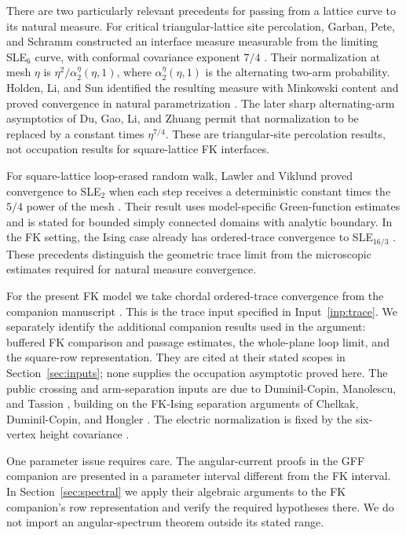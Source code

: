 There are two particularly relevant precedents for passing from a
lattice curve to its natural measure. For critical triangular-lattice
site percolation, Garban, Pete, and Schramm constructed an interface
measure measurable from the limiting SLE$_6$ curve, with conformal
covariance exponent $7/4$ \cite{GPS}. Their normalization at mesh
$\eta$ is $\eta^2/\alpha_2^\eta(\eta,1)$, where
$\alpha_2^\eta(\eta,1)$ is the alternating two-arm probability.
Holden, Li, and Sun identified the resulting measure with Minkowski
content and proved convergence in natural parametrization \cite{HLS}.
The later sharp alternating-arm asymptotics of Du, Gao, Li, and Zhuang
\cite{DGLZ} permit that normalization to be replaced by a constant
times $\eta^{7/4}$. These are triangular-site percolation results,
not occupation results for square-lattice FK interfaces.

For square-lattice loop-erased random walk, Lawler and Viklund proved
convergence to SLE$_2$ when each step receives a deterministic constant
times the $5/4$ power of the mesh \cite{LawlerViklund}. Their result
uses model-specific Green-function estimates and is stated for bounded
simply connected domains with analytic boundary. In the FK setting,
the Ising case already has ordered-trace convergence to SLE$_{16/3}$
\cite{IsingInterfaces}. These precedents distinguish the geometric
trace limit from the microscopic estimates required for natural
measure convergence.

For the present FK model we take chordal ordered-trace convergence
from the companion manuscript \cite[Theorem \texttt{chordal:trace}]{FKCompanion}.
This is the trace input specified in Input~\ref{inp:trace}. We separately
identify the additional companion results used in the argument:
buffered FK comparison and passage estimates, the whole-plane loop
limit, and the square-row representation. They are cited at their
stated scopes in Section~\ref{sec:inputs}; none supplies the occupation
asymptotic proved here. The public crossing and arm-separation inputs
are due to Duminil-Copin, Manolescu, and Tassion \cite{DMT}, building
on the FK-Ising separation arguments of Chelkak, Duminil-Copin, and
Hongler \cite{CDCH}. The electric normalization is fixed by the
six-vertex height covariance \cite{DKLM,GFFCompanion}.

One parameter issue requires care. The angular-current proofs in the
GFF companion are presented in a parameter interval different from
the FK interval. In Section~\ref{sec:spectral} we apply their algebraic
arguments to the FK companion's row representation and verify the
required hypotheses there. We do not import an angular-spectrum
theorem outside its stated range.


